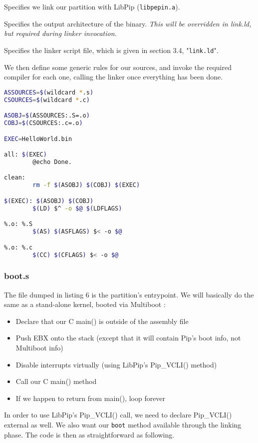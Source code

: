 \documentclass[10pt,a4paper,titlepage]{refart}
\begin{document}
Specifies we link our partition with LibPip (\texttt{libpepin.a}).

Specifies the output architecture of the binary. \textit{This will be overridden in link.ld, but required during linker invocation.}

Specifies the linker script file, which is given in section 3.4, "\texttt{link.ld}".

We then define some generic rules for our sources, and invoke the required compiler for each one, calling the linker once everything has been done.
\begin{lstlisting}[language=bash,caption={Makefile rules}]
ASSOURCES=$(wildcard *.s)
CSOURCES=$(wildcard *.c)

ASOBJ=$(ASSOURCES:.S=.o)
COBJ=$(CSOURCES:.c=.o)

EXEC=HelloWorld.bin

all: $(EXEC)
        @echo Done.

clean:
        rm -f $(ASOBJ) $(COBJ) $(EXEC)

$(EXEC): $(ASOBJ) $(COBJ)
        $(LD) $^ -o $@ $(LDFLAGS) 

%.o: %.S
        $(AS) $(ASFLAGS) $< -o $@

%.o: %.c
        $(CC) $(CFLAGS) $< -o $@
\end{lstlisting}

\subsubsection{boot.s}
The file dumped in listing 6 is the partition's entrypoint. We will basically do the same as a stand-alone kernel, booted via Multiboot :
\begin{itemize}
\item Declare that our C main() is outside of the assembly file
\item Push EBX onto the stack (except that it will contain Pip's boot info, not Multiboot info)
\item Disable interrupts virtually (using LibPip's Pip\_VCLI() method)
\item Call our C main() method
\item If we happen to return from main(), loop forever
\end{itemize}

In order to use LibPip's Pip\_VCLI() call, we need to declare Pip\_VCLI() external as well. We also want our \texttt{boot} method available through the linking phase.
The code is then as straightforward as following.
\end{document}
